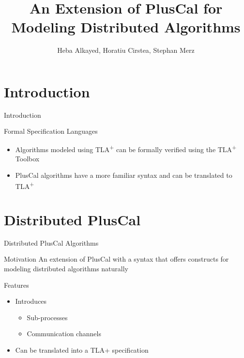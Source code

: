 \documentclass{beamer}
\title[Your Short Title]{An Extension of PlusCal for Modeling
Distributed Algorithms}
\institute{University of Lorraine, CNRS, Inria, Nancy, France}
\author[]{Heba Alkayed, Horatiu Cirstea, Stephan Merz}
\newcommand{\tlaplus}{TLA\textsuperscript{+}\xspace}
\begin{document}
\begin{frame}
  \titlepage
\end{frame}


\section{Introduction}

\begin{frame}{Introduction}

\begin{block}{Formal Specification Languages}
\begin{itemize}

  \item Algorithms modeled using \tlaplus can be formally verified using the \tlaplus Toolbox
 \item PlusCal algorithms have a more familiar syntax and can be translated to \tlaplus 
\end{itemize}
\end{block}
\vskip 1cm

\end{frame}

\section{Distributed PlusCal}

\begin{frame}[fragile]{Distributed PlusCal Algorithms}

\begin{block}{Motivation}
An extension of PlusCal with a syntax that offers constructs for modeling distributed algorithms naturally
\end{block}

\begin{block}{Features}
\begin{itemize}
  \item Introduces
  \begin{itemize} 
        \item Sub-processes
        \item Communication channels
    \end{itemize}
  \item Can be translated into a TLA+ specification
\end{itemize}
\end{block}
\end{frame}
\end{document}
